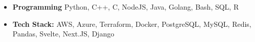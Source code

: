 
\begin{itemize}[leftmargin=9pt,label=]
  \item \textbf{Programming} Python, C++, C, NodeJS, Java, Golang, Bash, SQL, R
  \item \textbf{Tech Stack:}
    AWS,
    Azure,
    Terraform,
    Docker,
    PostgreSQL,
    MySQL,
    Redis,
    Pandas,
    Svelte,
    Next.JS,
    Django
\end{itemize}

\vspace{0.1cm} \par

